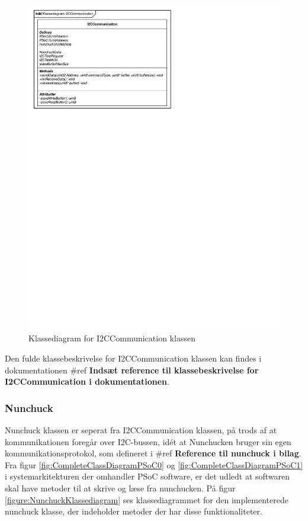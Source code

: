 \begin{figure}[H]
	\centering
	\includegraphics[]{DesignOgImplementering/images/I2CCommunication}
	\caption{Klassediagram for I2CCommunication klassen}
	\label{figure:klassediagramI2CCommunication}
\end{figure}

Den fulde klassebeskrivelse for I2CCommunication klassen kan findes i dokumentationen \#ref \textbf{Indsæt reference til klassebeskrivelse for I2CCommunication i dokumentationen}.

\subsubsection{Nunchuck}
Nunchuck klassen er seperat fra I2CCommunication klassen, på trods af at kommunikationen foregår over I2C-bussen, idét at Nunchucken bruger sin egen kommunikationsprotokol, som defineret i \#ref \textbf{Reference til nunchuck i bilag}. Fra figur \ref{fig:CompleteClassDiagramPSoC0} og \ref{fig:CompleteClassDiagramPSoC1} i systemarkitekturen der omhandler PSoC software, er det udledt at softwaren skal have metoder til at skrive og læse fra nunchucken. På figur \ref{figure:NunchuckKlassediagram} ses klassediagrammet for den implementerede nunchuck klasse, der indeholder metoder der har disse funktionaliteter.


